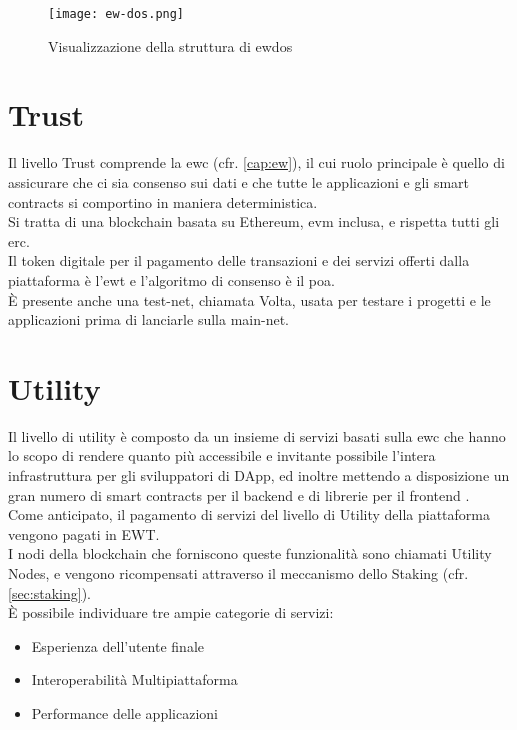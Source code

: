 \begin{figure}[h]
    \texttt{[image: ew-dos.png]}
    \centering
    \caption{Visualizzazione della struttura di \gls{ewdos} \cite{img:ew-dos}}
    \label{lab:ew-dos}
\end{figure}

\section{Trust}
Il livello Trust comprende la \gls{ewc} (cfr. \autoref{cap:ew}), 
il cui ruolo principale è quello di assicurare che ci sia consenso sui dati e che tutte le applicazioni e gli smart contracts si comportino in maniera deterministica. \\
Si tratta di una blockchain basata su Ethereum, \gls{evm} inclusa, e rispetta tutti gli \gls{erc}. \\
Il token digitale per il pagamento delle transazioni e dei servizi offerti dalla piattaforma è l'\gls{ewt} e l'algoritmo di consenso è il \gls{poa}. \\
È presente anche una test-net, chiamata Volta, usata per testare i progetti e le applicazioni prima di lanciarle sulla main-net. 

\section{Utility}
Il livello di utility è composto da un insieme di servizi basati sulla \gls{ewc} che hanno lo scopo di rendere quanto più accessibile e invitante possibile l'intera infrastruttura per gli sviluppatori di DApp,
ed inoltre mettendo a disposizione un gran numero di smart contracts per il backend e di librerie per il frontend \cite{art:ew-dos}. \\
Come anticipato, il pagamento di servizi del livello di Utility della piattaforma vengono pagati in EWT. \\
I nodi della blockchain che forniscono queste funzionalità sono chiamati Utility Nodes, e vengono ricompensati attraverso il meccanismo dello Staking (cfr. \autoref{sec:staking}).\\

È possibile individuare tre ampie categorie di servizi:
\begin{itemize}
    \item Esperienza dell'utente finale
    \item Interoperabilità Multipiattaforma
    \item Performance delle applicazioni
\end{itemize}

